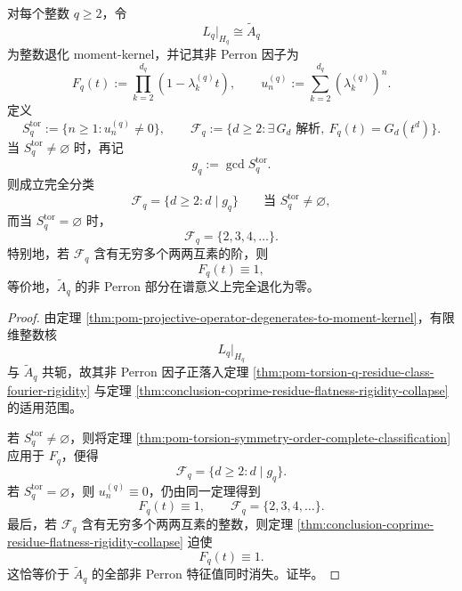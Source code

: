 \begin{theorem}\label{thm:conclusion-integer-moment-kernel-torsion-inheritance}
对每个整数 \(q\ge 2\)，令
\[
L_q|_{H_q}\cong \widetilde A_q
\]
为整数退化 moment-kernel，并记其非 Perron 因子为
\[
F_q(t):=\prod_{k=2}^{d_q}(1-\lambda_k^{(q)}t),
\qquad
u_n^{(q)}:=\sum_{k=2}^{d_q}(\lambda_k^{(q)})^n.
\]
定义
\[
S_q^{\mathrm{tor}}:=\{n\ge 1:u_n^{(q)}\neq 0\},
\qquad
\mathcal F_q:=
\{d\ge 2:\exists\,G_d\text{ 解析},\ F_q(t)=G_d(t^d)\}.
\]
当 \(S_q^{\mathrm{tor}}\neq\varnothing\) 时，再记
\[
g_q:=\gcd S_q^{\mathrm{tor}}.
\]
则成立完全分类
\[
\mathcal F_q=\{d\ge 2:d\mid g_q\}
\qquad
\text{当 }S_q^{\mathrm{tor}}\neq\varnothing,
\]
而当 \(S_q^{\mathrm{tor}}=\varnothing\) 时，
\[
\mathcal F_q=\{2,3,4,\dots\}.
\]
特别地，若 \(\mathcal F_q\) 含有无穷多个两两互素的阶，则
\[
F_q(t)\equiv 1,
\]
等价地，\(\widetilde A_q\) 的非 Perron 部分在谱意义上完全退化为零。
\end{theorem}
\begin{proof}
由定理 \ref{thm:pom-projective-operator-degenerates-to-moment-kernel}，有限维整数核
\[
L_q|_{H_q}
\]
与 \(\widetilde A_q\) 共轭，故其非 Perron 因子正落入定理 \ref{thm:pom-torsion-q-residue-class-fourier-rigidity} 与定理 \ref{thm:conclusion-coprime-residue-flatness-rigidity-collapse} 的适用范围。

若 \(S_q^{\mathrm{tor}}\neq\varnothing\)，则将定理 \ref{thm:pom-torsion-symmetry-order-complete-classification} 应用于 \(F_q\)，便得
\[
\mathcal F_q=\{d\ge 2:d\mid g_q\}.
\]
若 \(S_q^{\mathrm{tor}}=\varnothing\)，则 \(u_n^{(q)}\equiv 0\)，仍由同一定理得到
\[
F_q(t)\equiv 1,
\qquad
\mathcal F_q=\{2,3,4,\dots\}.
\]
最后，若 \(\mathcal F_q\) 含有无穷多个两两互素的整数，则定理 \ref{thm:conclusion-coprime-residue-flatness-rigidity-collapse} 迫使
\[
F_q(t)\equiv 1.
\]
这恰等价于 \(\widetilde A_q\) 的全部非 Perron 特征值同时消失。证毕。
\end{proof}
